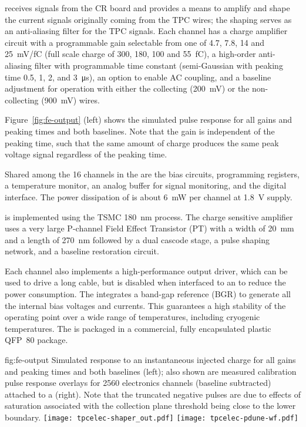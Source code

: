  receives signals from the CR board and
provides a means to amplify and shape the current signals originally coming from the TPC wires; the
shaping serves as an anti-aliasing filter for the TPC signals.
Each  channel has a charge amplifier circuit with a programmable
gain selectable from one of \num{4.7}, \num{7.8}, \num{14} and 25~mV/fC
(full scale charge of \num{300}, \num{180}, \num{100} and 55~fC),
a high-order anti-aliasing filter with programmable time
constant (semi-Gaussian with peaking time \num{0.5}, \num{1}, \num{2}, and \SI{3}{\micro\second}),
an option to enable AC coupling,
and a baseline adjustment for operation with either the collecting (\SI{200}{mV}) or the non-collecting (\SI{900}{mV}) wires.

Figure~\ref{fig:fe-output} (left) shows the simulated pulse response for all gains and peaking times and both baselines.
Note that the gain is independent of the peaking time, such that the same amount of charge produces the same peak voltage signal regardless of the peaking time.  

Shared among the 16 channels in the  are the bias circuits, programming registers,
a temperature monitor, an analog buffer for signal monitoring, and the digital interface.
The power dissipation of  is about \SI{6}{mW} per channel at \SI{1.8}{V} supply.

 is implemented using the TSMC \SI{180}{nm}  process.  The charge sensitive amplifier uses a very large P-channel Field Effect Transistor (PT) with a width of \SI{20}{mm} and a length of 270~nm followed by a dual cascode stage, a pulse shaping network, and a baseline restoration circuit.  

Each channel also implements a high-performance output driver,
which can be used to drive a long cable, but is disabled when interfaced to an   to reduce the power consumption.
The  integrates a band-gap reference (BGR) to generate all the internal bias voltages and currents.
This guarantees a high stability of the operating point over a wide range of
temperatures, including cryogenic temperatures.
The  is packaged in a commercial, fully encapsulated plastic QFP~80 package.

\begin{dunefigure}
{fig:fe-output}
{Simulated  response to an instantaneous injected charge for all gains and peaking times and both baselines (left); also shown are measured calibration pulse response overlays for \num{2560} electronics channels (baseline subtracted) attached to a   (right).  Note that the truncated negative pulses are due to effects of saturation associated with the collection plane threshold being close to the lower  boundary.}
\texttt{[image: tpcelec-shaper\_out.pdf]}
\texttt{[image: tpcelec-pdune-wf.pdf]}
\end{dunefigure}

